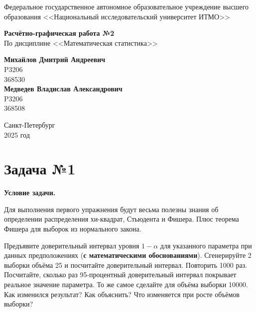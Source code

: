 \documentclass[12pt]{article}
\begin{document}
	
	\begin{titlepage}
		\begin{center}
			\large{Федеральное государственное автономное образовательное учреждение высшего образования <<Национальный исследовательский университет ИТМО>>}
		\end{center}
		
		\vspace{15em}
		
		\begin{center}
			\huge{\textbf{Расчётно-графическая работа №2}} \\
			\large{По дисциплине <<Математическая статистика>>}
		\end{center}
		
		\vspace{5em}
		
		\begin{flushright}
			\Large{\textbf{Михайлов Дмитрий Андреевич}} \\
			\Large{P3206} \\
			\Large{368530} \\
			\Large{\textbf{Медведев Владислав Александрович}} \\
			\Large{P3206} \\
			\Large{368508}
		\end{flushright}
		
		\vspace{10em}
		
		\begin{center}
			Санкт-Петербург \\
			2025 год
		\end{center}
	\end{titlepage}
	
	\tableofcontents
	\newpage
	
	\section*{Задача №1}
	
	\textbf{Условие задачи.}
	
	Для выполнения первого упражнения будут весьма полезны знания об определении распределения хи-квадрат, Стьюдента и Фишера. Плюс теорема Фишера для выборок из нормального закона.
	
	Предъявите доверительный интервал уровня $1 - \alpha$ для указанного параметра при данных предположениях (\textbf{с математическими обоснованиями}). Сгенерируйте 2 выборки объёма 25 и посчитайте доверительный интервал. Повторить 1000 раз. Посчитайте, сколько раз 95-процентный доверительный интервал покрывает реальное значение параметра. То же самое сделайте для объёма выборки 10000. Как изменился результат? Как объяснить? Что изменяется при росте объёмов выборки?
	
\end{document}

